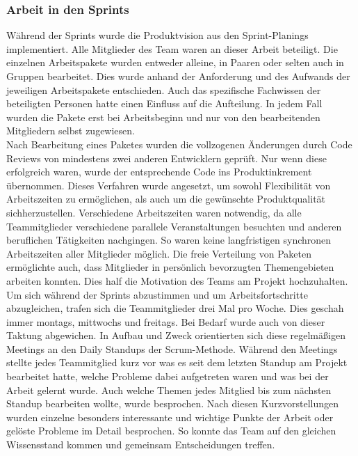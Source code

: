 \documentclass[10pt, a4paper]{article}
\begin{document}
\subsubsection{Arbeit in den Sprints}
Während der Sprints wurde die Produktvision aus den Sprint-Planings implementiert.
Alle Mitglieder des Team waren an dieser Arbeit beteiligt.
Die einzelnen Arbeitspakete wurden entweder alleine, in Paaren oder selten auch in Gruppen bearbeitet.
Dies wurde anhand der Anforderung und des Aufwands der jeweiligen Arbeitspakete entschieden.
Auch das spezifische Fachwissen der beteiligten Personen hatte einen Einfluss auf die Aufteilung.
In jedem Fall wurden die Pakete erst bei Arbeitsbeginn und nur von den bearbeitenden Mitgliedern selbst zugewiesen.
\\
Nach Bearbeitung eines Paketes wurden die vollzogenen Änderungen durch Code Reviews von mindestens zwei anderen Entwicklern geprüft.
Nur wenn diese erfolgreich waren, wurde der entsprechende Code ins Produktinkrement übernommen.
Dieses Verfahren wurde angesetzt, um sowohl Flexibilität von Arbeitszeiten zu ermöglichen, als auch um die gewünschte Produktqualität sichherzustellen.
Verschiedene Arbeitszeiten waren notwendig, da alle Teammitglieder verschiedene parallele Veranstaltungen besuchten und anderen beruflichen Tätigkeiten nachgingen.
So waren keine langfristigen synchronen Arbeitszeiten aller Mitglieder möglich.
Die freie Verteilung von Paketen ermöglichte auch, dass Mitglieder in persönlich bevorzugten Themengebieten arbeiten konnten.
Dies half die Motivation des Teams am Projekt hochzuhalten.
\\
Um sich während der Sprints abzustimmen und um Arbeitsfortschritte abzugleichen, trafen sich die Teammitglieder drei Mal pro Woche.
Dies geschah immer montags, mittwochs und freitags.
Bei Bedarf wurde auch von dieser Taktung abgewichen.
In Aufbau und Zweck orientierten sich diese regelmäßigen Meetings an den \glqq Daily Standups\grqq{} der Scrum-Methode.
Während den Meetings stellte jedes Teammitglied kurz vor was es seit dem letzten Standup am Projekt bearbeitet hatte, welche Probleme dabei aufgetreten waren und was bei der Arbeit gelernt wurde.
Auch welche Themen jedes Mitglied bis zum nächsten Standup bearbeiten wollte, wurde besprochen.
Nach diesen Kurzvorstellungen wurden einzelne besonders interessante und wichtige Punkte der Arbeit oder gelöste Probleme im Detail besprochen.
So konnte das Team auf den gleichen Wissensstand kommen und gemeinsam Entscheidungen treffen.
\end{document}
